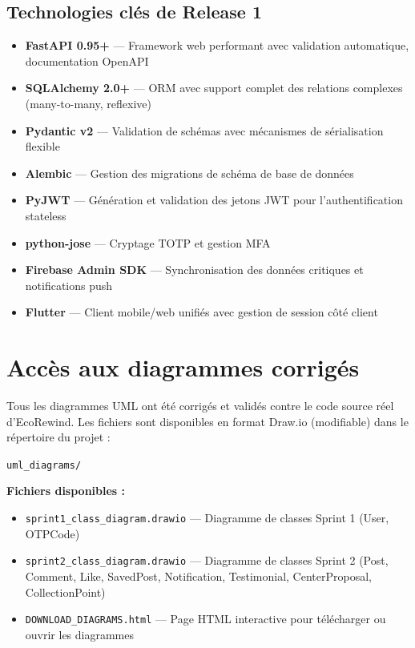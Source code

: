 \subsection{Technologies clés de Release 1}

\begin{itemize}
    \item \textbf{FastAPI 0.95+} — Framework web performant avec validation automatique, documentation OpenAPI
    \item \textbf{SQLAlchemy 2.0+} — ORM avec support complet des relations complexes (many-to-many, reflexive)
    \item \textbf{Pydantic v2} — Validation de schémas avec mécanismes de sérialisation flexible
    \item \textbf{Alembic} — Gestion des migrations de schéma de base de données
    \item \textbf{PyJWT} — Génération et validation des jetons JWT pour l'authentification stateless
    \item \textbf{python-jose} — Cryptage TOTP et gestion MFA
    \item \textbf{Firebase Admin SDK} — Synchronisation des données critiques et notifications push
    \item \textbf{Flutter} — Client mobile/web unifiés avec gestion de session côté client
\end{itemize}

\section{Accès aux diagrammes corrigés}
\label{sec:r1_diagrams_access}

Tous les diagrammes UML ont été corrigés et validés contre le code source réel d'EcoRewind. Les fichiers sont disponibles en format Draw.io (modifiable) dans le répertoire du projet :

\begin{center}
    \texttt{uml\_diagrams/}
\end{center}

\noindent\textbf{Fichiers disponibles :}
\begin{itemize}
    \item \texttt{sprint1\_class\_diagram.drawio} — Diagramme de classes Sprint 1 (User, OTPCode)
    \item \texttt{sprint2\_class\_diagram.drawio} — Diagramme de classes Sprint 2 (Post, Comment, Like, SavedPost, Notification, Testimonial, CenterProposal, CollectionPoint)
    \item \texttt{DOWNLOAD\_DIAGRAMS.html} — Page HTML interactive pour télécharger ou ouvrir les diagrammes
\end{itemize}

